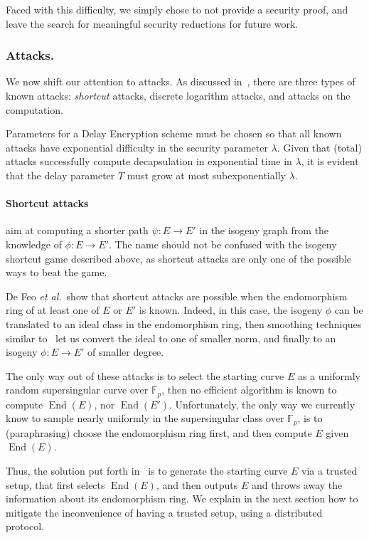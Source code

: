 \documentclass{llncs}
\newcommand{\F}{\mathbb{F}}
\DeclareMathOperator{\End}{End}
\begin{document}
Faced with this difficulty, we simply chose to not provide a security
proof, and leave the search for meaningful security reductions for
future work.

\subsubsection{Attacks.} We now shift our attention to attacks. %
As discussed in~\cite{10.1007/978-3-030-34578-5_10}, there are three
types of known attacks: \emph{shortcut} attacks, discrete logarithm
attacks, and attacks on the computation.

Parameters for a Delay Encryption scheme must be chosen so that all
known attacks have exponential difficulty in the security parameter
$\lambda$. %
Given that (total) attacks successfully compute decapsulation in
exponential time in $\lambda$, it is evident that the delay parameter
$T$ must grow at most subexponentially $\lambda$.

\paragraph{Shortcut attacks} aim at computing a shorter path
$\psi:E\to E'$ in the isogeny graph from the knowledge of
$\phi:E\to E'$. %
The name should not be confused with the isogeny shortcut game
described above, as shortcut attacks are only one of the possible ways
to beat the game.

De Feo \emph{et al.}\ show that shortcut attacks are possible when the
endomorphism ring of at least one of $E$ or $E'$ is known. %
Indeed, in this case, the isogeny $\phi$ can be translated to an ideal
class in the endomorphism ring, then smoothing techniques similar
to~\cite{kohel2014quaternion} let us convert the ideal to one of
smaller norm, and finally to an isogeny $\phi:E\to E'$ of smaller
degree.

The only way out of these attacks is to select the starting curve $E$
as a uniformly random supersingular curve over $\F_p$, then no
efficient algorithm is known to compute $\End(E)$, nor $\End(E')$. %
Unfortunately, the only way we currently know to sample nearly
uniformly in the supersingular class over $\F_p$, is to
(paraphrasing) choose the endomorphism ring first, and then compute
$E$ given $\End(E)$.

Thus, the solution put forth in~\cite{10.1007/978-3-030-34578-5_10} is
to generate the starting curve $E$ via a trusted setup, that first
selects $\End(E)$, and then outputs $E$ and throws away the
information about its endomorphism ring. %
We explain in the next section how to mitigate the inconvenience of
having a trusted setup, using a distributed protocol.
\end{document}
